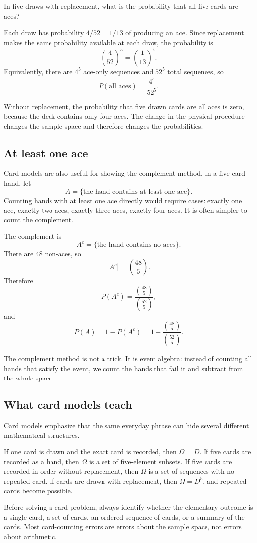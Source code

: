 \begin{examplebox}
In five draws with replacement, what is the probability that all five cards are
aces?

Each draw has probability \(4/52=1/13\) of producing an ace. Since replacement
makes the same probability available at each draw, the probability is
\[
\left(\frac{4}{52}\right)^5=\left(\frac1{13}\right)^5.
\]
Equivalently, there are \(4^5\) ace-only sequences and \(52^5\) total sequences,
so
\[
P(\text{all aces})=\frac{4^5}{52^5}.
\]
\end{examplebox}

Without replacement, the probability that five drawn cards are all aces is zero,
because the deck contains only four aces. The change in the physical procedure
changes the sample space and therefore changes the probabilities.

\subsection*{At least one ace}

Card models are also useful for showing the complement method. In a five-card
hand, let
\[
A=\{\text{the hand contains at least one ace}\}.
\]
Counting hands with at least one ace directly would require cases: exactly one
ace, exactly two aces, exactly three aces, exactly four aces. It is often simpler
to count the complement.

The complement is
\[
A^c=\{\text{the hand contains no aces}\}.
\]
There are \(48\) non-aces, so
\[
|A^c|=\binom{48}{5}.
\]
Therefore
\[
P(A^c)=\frac{\binom{48}{5}}{\binom{52}{5}},
\]
and
\[
P(A)=1-P(A^c)=1-\frac{\binom{48}{5}}{\binom{52}{5}}.
\]

The complement method is not a trick. It is event algebra: instead of counting
all hands that satisfy the event, we count the hands that fail it and subtract
from the whole space.

\subsection*{What card models teach}

Card models emphasize that the same everyday phrase can hide several different
mathematical structures.

If one card is drawn and the exact card is recorded, then \(\Omega=D\). If five
cards are recorded as a hand, then \(\Omega\) is a set of five-element subsets.
If five cards are recorded in order without replacement, then \(\Omega\) is a
set of sequences with no repeated card. If cards are drawn with replacement,
then \(\Omega=D^5\), and repeated cards become possible.

\begin{remarkbox}
Before solving a card problem, always identify whether the elementary outcome is
a single card, a set of cards, an ordered sequence of cards, or a summary of the
cards. Most card-counting errors are errors about the sample space, not errors
about arithmetic.
\end{remarkbox}
